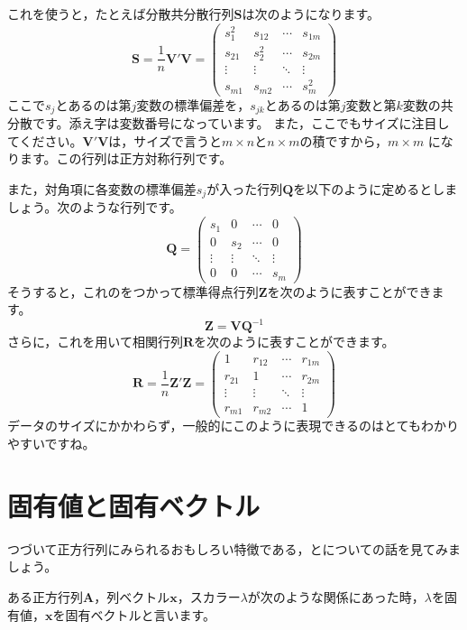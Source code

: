 \documentclass{ltjsbook}
\begin{document}
これを使うと，たとえば分散共分散行列$\bm{S}$は次のようになります。
\[ \bm{S} = \frac{1}{n} \bm{V}' \bm{V} = \begin{pmatrix}
		s_1^2  & s_{12} & \cdots & s_{1m} \\
		s_{21} & s_2^2  & \cdots & s_{2m} \\
		\vdots & \vdots & \ddots & \vdots \\
		s_{m1} & s_{m2} & \cdots & s_m^2\end{pmatrix} \]
ここで$s_j$とあるのは第$j$変数の標準偏差を，$s_{jk}$とあるのは第$j$変数と第$k$変数の共分散です。添え字は変数番号になっています。
また，ここでもサイズに注目してください。$\bm{V}'\bm{V}$は，サイズで言うと$m \times n$と$n \times m$の積ですから，$m \times m$ になります。この行列は正方対称行列です。

また，対角項に各変数の標準偏差$s_j$が入った行列$\bm{Q}$を以下のように定めるとしましょう。次のような行列です。
\[ \bm{Q} = \begin{pmatrix} s_1    & 0      & \cdots & 0      \\
                0      & s_2    & \cdots & 0      \\
                \vdots & \vdots & \ddots & \vdots \\
                0      & 0      & \cdots & s_m\end{pmatrix} \]
そうすると，これのをつかって標準得点行列$\bm{Z}$を次のように表すことができます。
\[ \bm{Z} = \bm{V} \bm{Q}^{-1} \]
さらに，これを用いて相関行列$\bm{R}$を次のように表すことができます。
\[ \bm{R} = \frac{1}{n}\bm{Z}' \bm{Z} = \begin{pmatrix} 1      & r_{12} & \cdots & r_{1m} \\
                r_{21} & 1      & \cdots & r_{2m} \\
                \vdots & \vdots & \ddots & \vdots \\
                r_{m1} & r_{m2} & \cdots & 1\end{pmatrix} \]
データのサイズにかかわらず，一般的にこのように表現できるのはとてもわかりやすいですね。


\section{固有値と固有ベクトル}
つづいて正方行列にみられるおもしろい特徴である，とについての話を見てみましょう。

ある正方行列$\bm{A}$，列ベクトル$\bm{x}$，スカラー$\lambda$が次のような関係にあった時，$\lambda$を固有値，$\bm{x}$を固有ベクトルと言います。
\end{document}

